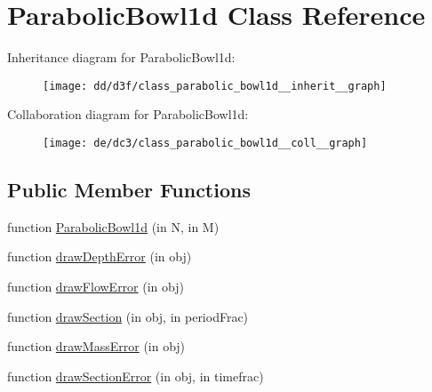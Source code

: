 \hypertarget{class_parabolic_bowl1d}{}\section{Parabolic\+Bowl1d Class Reference}
\label{class_parabolic_bowl1d}


Inheritance diagram for Parabolic\+Bowl1d\+:
\nopagebreak
\begin{figure}[H]
\begin{center}
\leavevmode
\texttt{[image: dd/d3f/class\_parabolic\_bowl1d\_\_inherit\_\_graph]}
\end{center}
\end{figure}


Collaboration diagram for Parabolic\+Bowl1d\+:
\nopagebreak
\begin{figure}[H]
\begin{center}
\leavevmode
\texttt{[image: de/dc3/class\_parabolic\_bowl1d\_\_coll\_\_graph]}
\end{center}
\end{figure}
\subsection*{Public Member Functions}
\begin{DoxyCompactItemize}
\item 
function \hyperlink{class_parabolic_bowl1d_a557bdce485a3f85972c4d699f4a49f3c}{Parabolic\+Bowl1d} (in N, in M)
\item 
function \hyperlink{class_parabolic_bowl1d_aab469ead195463f6316305f790f66beb}{draw\+Depth\+Error} (in obj)
\item 
function \hyperlink{class_parabolic_bowl1d_ae4c4d2461801c3441aa1f66dc5ca2443}{draw\+Flow\+Error} (in obj)
\item 
function \hyperlink{class_parabolic_bowl1d_af5c3937be0135c29386d685a3c8e62be}{draw\+Section} (in obj, in period\+Frac)
\item 
function \hyperlink{class_parabolic_bowl1d_ab90e776735e3f8656ce25162c91c10be}{draw\+Mass\+Error} (in obj)
\item 
function \hyperlink{class_parabolic_bowl1d_a9886a572e746d2f359bd1ea3f70af062}{draw\+Section\+Error} (in obj, in timefrac)
\end{DoxyCompactItemize}
